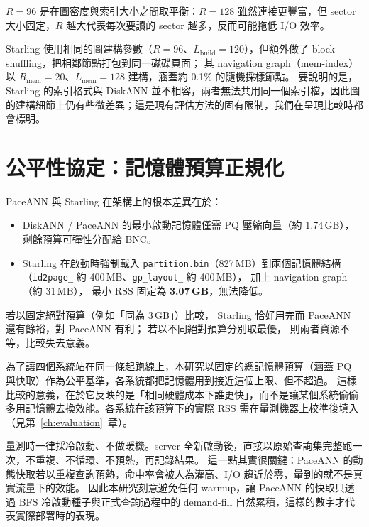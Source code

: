 $R=96$ 是在圖密度與索引大小之間取平衡：$R=128$ 雖然連接更豐富，但 sector 大小固定，$R$ 越大代表每次要讀的 sector 越多，反而可能拖低 I/O 效率。

Starling 使用相同的圖建構參數（$R=96$、$L_\text{build}=120$），但額外做了 block shuffling，把相鄰節點打包到同一磁碟頁面；
其 navigation graph（mem-index）以 $R_\text{mem}=20$、$L_\text{mem}=128$ 建構，涵蓋約 0.1\% 的隨機採樣節點。
要說明的是，Starling 的索引格式與 DiskANN 並不相容，兩者無法共用同一個索引檔，因此圖的建構細節上仍有些微差異；這是現有評估方法的固有限制，我們在呈現比較時都會標明。

\section{公平性協定：記憶體預算正規化}
\label{sec:fairness}

PaceANN 與 Starling 在架構上的根本差異在於：

\begin{itemize}
  \item DiskANN / PaceANN 的最小啟動記憶體僅需 PQ 壓縮向量（約 1.74\,GB），
    剩餘預算可彈性分配給 BNC。
  \item Starling 在啟動時強制載入 \texttt{partition.bin}（827\,MB）到兩個記憶體結構
    （\texttt{id2page\_} 約 400\,MB、\texttt{gp\_layout\_} 約 400\,MB），
    加上 navigation graph（約 31\,MB），
    最小 RSS 固定為 \textbf{3.07\,GB}，無法降低。
\end{itemize}

若以固定絕對預算（例如「同為 3\,GB」）比較，
Starling 恰好用完而 PaceANN 還有餘裕，對 PaceANN 有利；
若以不同絕對預算分別取最優，
則兩者資源不等，比較失去意義。

為了讓四個系統站在同一條起跑線上，本研究以固定的總記憶體預算（涵蓋 PQ 與快取）作為公平基準，各系統都把記憶體用到接近這個上限、但不超過。
這樣比較的意義，在於它反映的是「相同硬體成本下誰更快」，而不是讓某個系統偷偷多用記憶體去換效能。各系統在該預算下的實際 RSS 需在量測機器上校準後填入（見第~\ref{ch:evaluation}~章）。

量測時一律採冷啟動、不做暖機。server 全新啟動後，直接以原始查詢集完整跑一次，不重複、不循環、不預熱，再記錄結果。
這一點其實很關鍵：PaceANN 的動態快取若以重複查詢預熱，命中率會被人為灌高、I/O 趨近於零，量到的就不是真實流量下的效能。
因此本研究刻意避免任何 warmup，讓 PaceANN 的快取只透過 BFS 冷啟動種子與正式查詢過程中的 demand-fill 自然累積，這樣的數字才代表實際部署時的表現。

